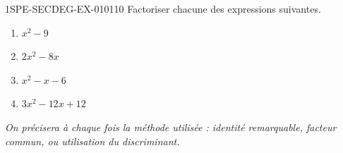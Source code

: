 \begin{exercice}{1SPE-SECDEG-EX-010}{1}{10}
Factoriser chacune des expressions suivantes.

\begin{enumerate}
  \item $x^2 - 9$
  \item $2x^2 - 8x$
  \item $x^2 - x - 6$
  \item $3x^2 - 12x + 12$
\end{enumerate}

\textit{On précisera à chaque fois la méthode utilisée : identité remarquable, facteur commun, ou utilisation du discriminant.}
\end{exercice}
